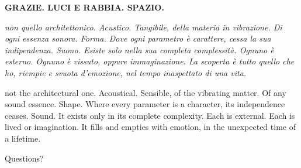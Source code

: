 \documentclass[10pt]{beamer}
\begin{document}

{%
\begin{frame}[fragile]{\textbf{GRAZIE. LUCI E RABBIA. SPAZIO.}}

\emph{non quello architettonico. Acustico. Tangibile, della materia in vibrazione. Di ogni essenza sonora. Forma. Dove ogni parametro è carattere, cessa la sua indipendenza. Suono. Esiste solo nella sua completa complessità. Ognuno è esterno. Ognuno è vissuto, oppure immaginazione. La scoperta è tutto quello che ho, riempie e svuota d'emozione, nel tempo inaspettato di una vita.}

not the architectural one. Acoustical. Sensible, of the vibrating matter. Of any sound essence. Shape. Where every parameter is a character, its independence ceases. Sound. It exists only in its complete complexity. Each is external. Each is lived or imagination. It fills and empties with emotion, in the unexpected time of a lifetime.

\end{frame}
}


\begin{frame}[standout]
  Questions?
\end{frame}

\end{document}
